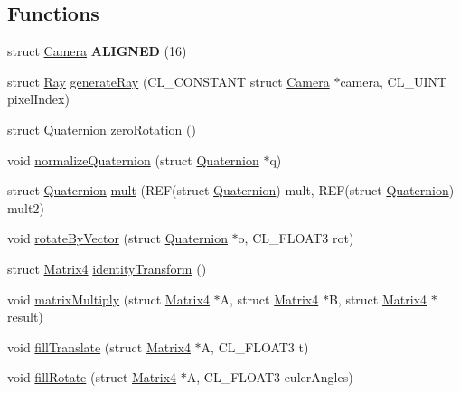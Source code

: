 \subsection*{Functions}
\begin{DoxyCompactItemize}
\item 
struct \hyperlink{struct_camera}{Camera} {\bfseries A\+L\+I\+G\+N\+ED} (16)\hypertarget{group__g12_gaea33ae48b635ad9b2743def63fa6f706}{}\label{group__g12_gaea33ae48b635ad9b2743def63fa6f706}

\item 
struct \hyperlink{struct_ray}{Ray} \hyperlink{group__g12_ga058f44d2ffec7f4fb4c6d7bdb978f4c6}{generate\+Ray} (C\+L\+\_\+\+C\+O\+N\+S\+T\+A\+NT struct \hyperlink{struct_camera}{Camera} $\ast$camera, C\+L\+\_\+\+U\+I\+NT pixel\+Index)
\item 
struct \hyperlink{struct_quaternion}{Quaternion} \hyperlink{group__g12_ga8e90961bd8e958f842a255b663bbda6e}{zero\+Rotation} ()
\item 
void \hyperlink{group__g12_ga2f45f34d3f9c9772ede30ea194d34657}{normalize\+Quaternion} (struct \hyperlink{struct_quaternion}{Quaternion} $\ast$q)
\item 
struct \hyperlink{struct_quaternion}{Quaternion} \hyperlink{group__g12_gaa23c7bc48e9d48b785b695ec40123440}{mult} (R\+EF(struct \hyperlink{struct_quaternion}{Quaternion}) mult, R\+EF(struct \hyperlink{struct_quaternion}{Quaternion}) mult2)
\item 
void \hyperlink{group__g12_gaff678888c35ddafcc3f7ed58046f8d9b}{rotate\+By\+Vector} (struct \hyperlink{struct_quaternion}{Quaternion} $\ast$o, C\+L\+\_\+\+F\+L\+O\+A\+T3 rot)
\item 
struct \hyperlink{struct_matrix4}{Matrix4} \hyperlink{group__g12_gaf163e6982adb392dfe7dfc845c66d81e}{identity\+Transform} ()
\item 
void \hyperlink{group__g12_ga87905ca25c2eada7209c07e156951dc0}{matrix\+Multiply} (struct \hyperlink{struct_matrix4}{Matrix4} $\ast$A, struct \hyperlink{struct_matrix4}{Matrix4} $\ast$B, struct \hyperlink{struct_matrix4}{Matrix4} $\ast$result)
\item 
void \hyperlink{group__g12_gac5d8d3988ebf6814b6f9adfd1fb0b4d2}{fill\+Translate} (struct \hyperlink{struct_matrix4}{Matrix4} $\ast$A, C\+L\+\_\+\+F\+L\+O\+A\+T3 t)
\item 
void \hyperlink{group__g12_gab120779e5ed91425889e3c8ac2a165e6}{fill\+Rotate} (struct \hyperlink{struct_matrix4}{Matrix4} $\ast$A, C\+L\+\_\+\+F\+L\+O\+A\+T3 euler\+Angles)
\item 

\end{DoxyCompactItemize}
